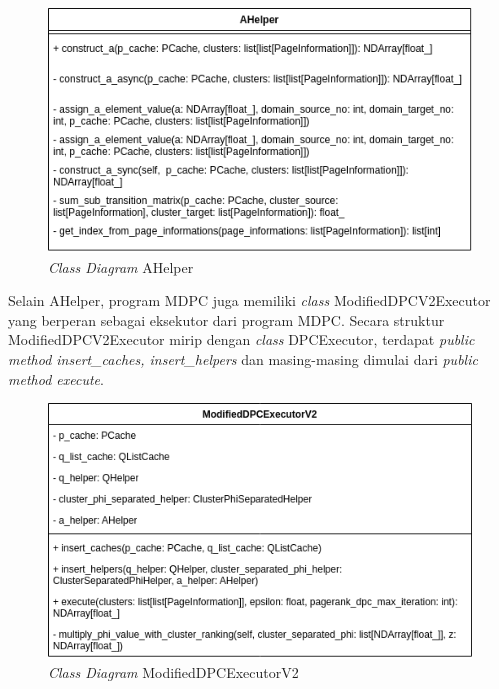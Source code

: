 \begin{figure}[H]
	\centering
	\includegraphics[keepaspectratio, width={\textwidth}]{gambar/a_helper_class_diagram}
	\caption{\textit{Class Diagram} AHelper}
\end{figure}

Selain AHelper, program MDPC juga memiliki \textit{class} ModifiedDPCV2Executor yang berperan sebagai eksekutor dari program MDPC. Secara struktur ModifiedDPCV2Executor mirip dengan \textit{class} DPCExecutor, terdapat \textit{public method insert\_caches, insert\_helpers} dan masing-masing dimulai dari \textit{public method execute}. 

\begin{figure}[H]
	\centering
	\includegraphics[keepaspectratio, width={\textwidth}]{gambar/modified_dpc_executor_v2_class_diagram}
	\caption{\textit{Class Diagram} ModifiedDPCExecutorV2}
\end{figure}

